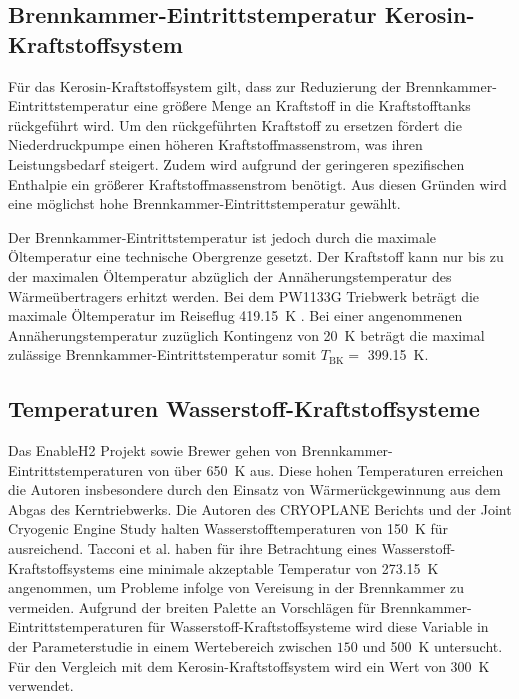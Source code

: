 \subsection{Brennkammer-Eintrittstemperatur Kerosin-Kraftstoffsystem}

Für das Kerosin-Kraftstoffsystem gilt, dass zur Reduzierung der Brennkammer-Eintrittstemperatur eine größere Menge an Kraftstoff in die Kraftstofftanks rückgeführt wird. Um den rückgeführten Kraftstoff zu ersetzen fördert die Niederdruckpumpe einen höheren Kraftstoffmassenstrom, was ihren Leistungsbedarf steigert. Zudem wird aufgrund der geringeren spezifischen Enthalpie ein größerer Kraftstoffmassenstrom benötigt. Aus diesen Gründen wird eine möglichst hohe Brennkammer-Eintrittstemperatur gewählt. 

Der Brennkammer-Eintrittstemperatur ist jedoch durch die maximale Öltemperatur eine technische Obergrenze gesetzt. Der Kraftstoff kann nur bis zu der maximalen Öltemperatur abzüglich der Annäherungstemperatur des Wärmeübertragers erhitzt werden. Bei dem PW1133G Triebwerk beträgt die maximale Öltemperatur im Reiseflug \SI{419.15}{\K} \cite{EASA.2018}. Bei einer angenommenen Annäherungstemperatur zuzüglich Kontingenz von \SI{20}{\K} beträgt die maximal zulässige Brennkammer-Eintrittstemperatur somit $T_\mathrm{BK}=$ \SI{399.15}{\K}.

\subsection{Temperaturen Wasserstoff-Kraftstoffsysteme}

Das EnableH2 Projekt \cite{Patrao.2023} sowie Brewer \cite{Brewer.1991} gehen von Brennkammer-Eintrittstemperaturen von über \SI{650}{\K} aus. Diese hohen Temperaturen erreichen die Autoren insbesondere durch den Einsatz von Wärmerückgewinnung aus dem Abgas des Kerntriebwerks. Die Autoren des CRYOPLANE Berichts \cite{Scholz.2003} und der Joint Cryogenic Engine Study \cite{SIMON.1994} halten Wasserstofftemperaturen von \SI{150}{\K} für ausreichend. Tacconi et al. \cite{Tacconi.2023} haben für ihre Betrachtung eines Wasserstoff-Kraftstoffsystems eine minimale akzeptable Temperatur von \SI{273.15}{\K} angenommen, um Probleme infolge von Vereisung in der Brennkammer zu vermeiden. Aufgrund der breiten Palette an Vorschlägen für Brennkammer-Eintrittstemperaturen für Wasserstoff-Kraftstoffsysteme wird diese Variable in der Parameterstudie in einem Wertebereich zwischen $150$ und \SI{500}{\K} untersucht. Für den Vergleich mit dem Kerosin-Kraftstoffsystem wird ein Wert von \SI{300}{\K} verwendet.

